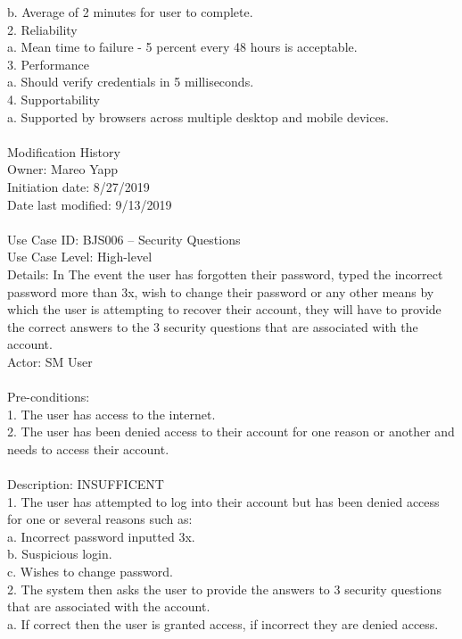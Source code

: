 \documentclass{report}
\begin{document}
	b.	Average of 2 minutes for user to complete.\\
2.	Reliability\\
	a.	Mean time to failure - 5 percent every 48 hours is acceptable.\\
3.	Performance\\
	a.	Should verify credentials in 5 milliseconds.\\
4.	Supportability\\
	a.	Supported by browsers across multiple desktop and mobile devices.\\
\\
Modification History\\
     Owner: Mareo Yapp\\
     Initiation date: 8/27/2019\\
     Date last modified: 9/13/2019\\
\\
Use Case ID: BJS006 – Security Questions\\
Use Case Level: High-level\\
Details:  In The event the user has forgotten their password, typed the incorrect password more than 3x, wish to change their password or any other means by which the user is attempting to recover their account, they will have to provide the correct answers to the 3 security questions that are associated with the account.\\
Actor: SM User\\
\\
Pre-conditions: \\
1.	The user has access to the internet.\\
2.	The user has been denied access to their account for one reason or another and needs to access their account.\\
\\
Description: INSUFFICENT\\
1.	The user has attempted to log into their account but has been denied access for one or several reasons such as:\\
a.	Incorrect password inputted 3x.\\
b.	Suspicious login.\\
c.	Wishes to change password.\\
2.	The system then asks the user to provide the answers to 3 security questions that are associated with the account.\\
a.	If correct then the user is granted access, if incorrect they are denied access.\\
\end{document}
